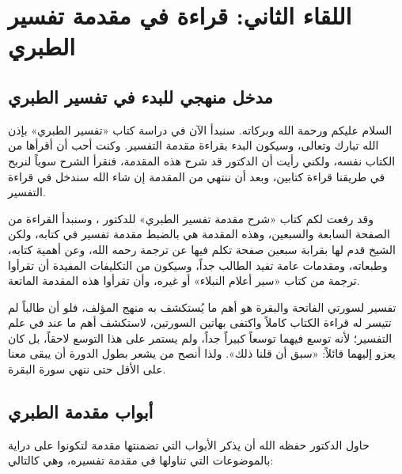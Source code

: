 \chapter{اللقاء الثاني: قراءة في مقدمة تفسير الطبري}

\section{مدخل منهجي للبدء في تفسير الطبري}
السلام عليكم ورحمة الله وبركاته. سنبدأ الآن في دراسة كتاب «تفسير الطبري» بإذن الله تبارك وتعالى، وسيكون البدء بقراءة مقدمة التفسير. وكنت أحب أن أقرأها من الكتاب نفسه، ولكني رأيت أن الدكتور  قد شرح هذه المقدمة، فنقرأ الشرح سوياً لنربح في طريقنا قراءة كتابين، وبعد أن ننتهي من المقدمة إن شاء الله سندخل في قراءة التفسير.

وقد رفعت لكم كتاب «شرح مقدمة تفسير الطبري» للدكتور ، وسنبدأ القراءة من الصفحة السابعة والسبعين، وهذه المقدمة هي بالضبط مقدمة تفسير  في كتابه، ولكن الشيخ قدم لها بقرابة سبعين صفحة تكلم فيها عن ترجمة  رحمه الله، وعن أهمية كتابه، وطبعاته، ومقدمات عامة تفيد الطالب جداً، وسيكون من التكليفات المفيدة أن تقرأوا ترجمة  من كتاب «سير أعلام النبلاء» أو غيره، وأن تقرأوا هذه المقدمة الماتعة.

\begin{fawaid}
تفسير  لسورتي الفاتحة والبقرة هو أهم ما يُستكشف به منهج المؤلف، فلو أن طالباً لم تتيسر له قراءة الكتاب كاملاً واكتفى بهاتين السورتين، لاستكشف أهم ما عند  في علم التفسير؛ لأنه توسع فيهما توسعاً كبيراً جداً، ولم يستمر على هذا التوسع لاحقاً، بل كان يعزو إليهما قائلاً: «سبق أن قلنا ذلك». ولذا أنصح من يشعر بطول الدورة أن يبقى معنا على الأقل حتى ننهي سورة البقرة.
\end{fawaid}

\section{أبواب مقدمة الطبري}
حاول الدكتور  حفظه الله أن يذكر الأبواب التي تضمنتها مقدمة  لتكونوا على دراية بالموضوعات التي تناولها في مقدمة تفسيره، وهي كالتالي:

